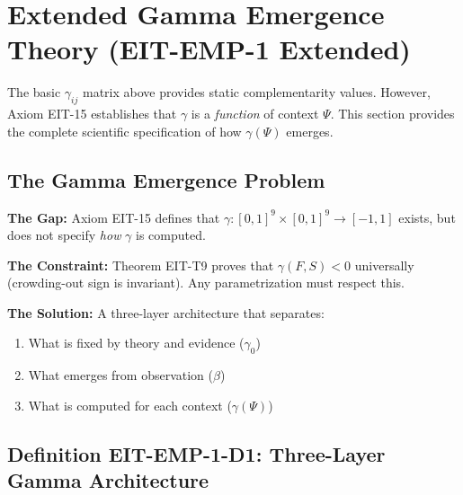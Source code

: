 \section{Extended Gamma Emergence Theory (EIT-EMP-1 Extended)}
\label{sec:ie-gamma-emergence}

The basic $\gamma_{ij}$ matrix above provides static complementarity values. However, Axiom EIT-15 establishes that $\gamma$ is a \textit{function} of context $\Psi$. This section provides the complete scientific specification of how $\gamma(\Psi)$ emerges.

\subsection{The Gamma Emergence Problem}
\label{subsec:gamma-emergence-problem}

\begin{tcolorbox}[colback=blue!5!white, colframe=blue!75!black,
    title=\textbf{Scientific Problem: From Static to Dynamic Complementarity}]

\textbf{The Gap:} Axiom EIT-15 defines that $\gamma: [0,1]^9 \times [0,1]^9 \rightarrow [-1,1]$ exists, but does not specify \textit{how} $\gamma$ is computed.

\textbf{The Constraint:} Theorem EIT-T9 proves that $\gamma(F, S) < 0$ universally (crowding-out sign is invariant). Any parametrization must respect this.

\textbf{The Solution:} A three-layer architecture that separates:
\begin{enumerate}[nosep]
    \item What is fixed by theory and evidence ($\gamma_0$)
    \item What emerges from observation ($\beta$)
    \item What is computed for each context ($\gamma(\Psi)$)
\end{enumerate}

\end{tcolorbox}

\subsection{Definition EIT-EMP-1-D1: Three-Layer Gamma Architecture}
\label{subsec:three-layer-gamma}

